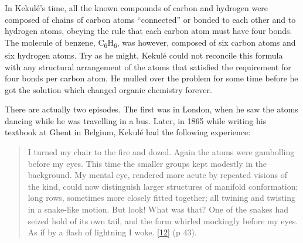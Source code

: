 \documentclass[
  a4paper,
]{article}
\begin{document}
In Kekulé's time, all the known compounds of carbon and hydrogen were
composed of chains of carbon atoms ``connected'' or bonded to each other
and to hydrogen atoms, obeying the rule that each carbon atom must have
four bonds. The molecule of benzene,
C\textsubscript{6}H\textsubscript{6}, was however, composed of six
carbon atoms and six hydrogen atoms. Try as he might, Kekulé could not
reconcile this formula with any structural arrangement of the atoms that
satisfied the requirement for four bonds per carbon atom. He mulled over
the problem for some time before he got the solution which changed
organic chemistry forever.

There are actually two episodes. The first was in London, when he saw
the atoms dancing while he was travelling in a bus. Later, in 1865 while
writing his textbook at Ghent in Belgium, Kekulé had the following
experience:

\begin{quote}
I turned my chair to the fire and dozed. Again the atoms were gambolling
before my eyes. This time the smaller groups kept modestly in the
background. My mental eye, rendered more acute by repeated visions of
the kind, could now distinguish larger structures of manifold
conformation; long rows, sometimes more closely fitted together; all
twining and twisting in a snake-like motion. But look! What was that?
One of the snakes had seized hold of its own tail, and the form whirled
mockingly before my eyes. As if by a flash of lightning I woke.
\protect\hyperlink{ref-findlay37}{{[}12{]}} (p 43).
\end{quote}
\end{document}
